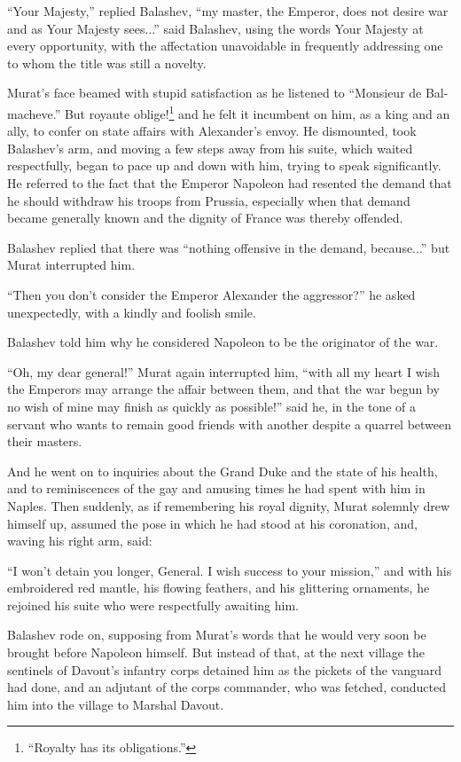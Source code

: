 ``Your Majesty,'' replied Balashev, ``my master, the Emperor,
does not desire war and as Your Majesty sees...'' said Balashev,
using the words Your Majesty at every opportunity, with the
affectation unavoidable in frequently addressing one to whom the
title was still a novelty.

Murat's face beamed with stupid satisfaction as he listened to
``Monsieur de Bal-macheve.'' But royaute
oblige!\footnote{``Royalty has its obligations.''} and he felt it
incumbent on him, as a king and an ally, to confer on state
affairs with Alexander's envoy. He dismounted, took Balashev's
arm, and moving a few steps away from his suite, which waited
respectfully, began to pace up and down with him, trying to speak
significantly. He referred to the fact that the Emperor Napoleon
had resented the demand that he should withdraw his troops from
Prussia, especially when that demand became generally known and
the dignity of France was thereby offended.

Balashev replied that there was ``nothing offensive in the
demand, because...'' but Murat interrupted him.

``Then you don't consider the Emperor Alexander the aggressor?''
he asked unexpectedly, with a kindly and foolish smile.

Balashev told him why he considered Napoleon to be the originator
of the war.

``Oh, my dear general!'' Murat again interrupted him, ``with all
my heart I wish the Emperors may arrange the affair between them,
and that the war begun by no wish of mine may finish as quickly
as possible!'' said he, in the tone of a servant who wants to
remain good friends with another despite a quarrel between their
masters.

And he went on to inquiries about the Grand Duke and the state of
his health, and to reminiscences of the gay and amusing times he
had spent with him in Naples. Then suddenly, as if remembering
his royal dignity, Murat solemnly drew himself up, assumed the
pose in which he had stood at his coronation, and, waving his
right arm, said:

``I won't detain you longer, General. I wish success to your
mission,'' and with his embroidered red mantle, his flowing
feathers, and his glittering ornaments, he rejoined his suite who
were respectfully awaiting him.

Balashev rode on, supposing from Murat's words that he would very
soon be brought before Napoleon himself. But instead of that, at
the next village the sentinels of Davout's infantry corps
detained him as the pickets of the vanguard had done, and an
adjutant of the corps commander, who was fetched, conducted him
into the village to Marshal Davout.

